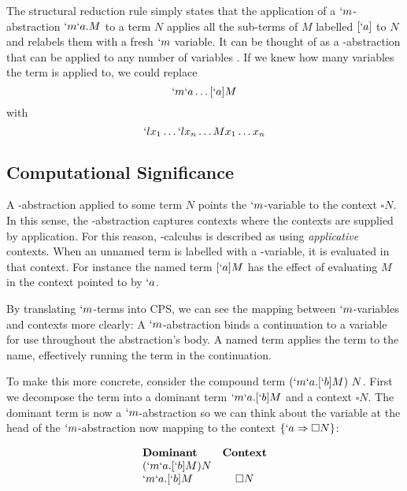   The structural reduction rule simply states that the application of a $`m$-abstraction $`m`a.M$ to a term $N$ applies all the sub-terms of $M$ labelled $[`a]$ to $N$ and relabels them with a fresh $`m$ variable.
  It can be thought of as a \lam-abstraction that can be applied to any number of variables \cite{Parigot92}.
  If we knew how many variables the term is applied to, we could replace
  \[ `m`a\dots[`a]M \]
  with 
  \[ `lx_1\dots`lx_n\dots Mx_1\dots x_n \]
  
  \subsection{Computational Significance}

  A \lmu-abstraction applied to some term $N$ points the $`m$-variable to the context $\square N$.
  In this sense, the \lmu-abstraction captures contexts where the contexts are supplied by application.
  For this reason, \lmu-calculus is described as using \emph{applicative} contexts.
  When an unnamed term is labelled with a \lmu-variable, it is evaluated in that context. 
  For instance the named term $[`a]M$ has the effect of evaluating $M$ in the context pointed to by $`a$.
  
  By translating $`m$-terms into CPS, we can see the mapping between $`m$-variables and contexts more clearly:
  A $`m$-abstraction binds a continuation to a variable for use throughout the abstraction's body.
  A named term applies the term to the name, effectively running the term in the continuation.
  
  To make this more concrete, consider the compound term $(`m`a.[`b]M)\ N$. 
  First we decompose the term into a dominant term $`m`a.[`b]M$ and a context $\square N$. 
  The dominant term is now a $`m$-abstraction so we can think about the variable at the head of the $`m$-abstraction now mapping to the context $\{`a \Rightarrow \square N\}$:
  
  \begin{example}[]
  \[
  \begin{array}{lc}
    \textbf{Dominant} & \textbf{Context} \\
    (`m`a.[`b]M) N \\
    `m`a.[`b]M & \square N \\
  \end{array}
  \]
  \end{example}

